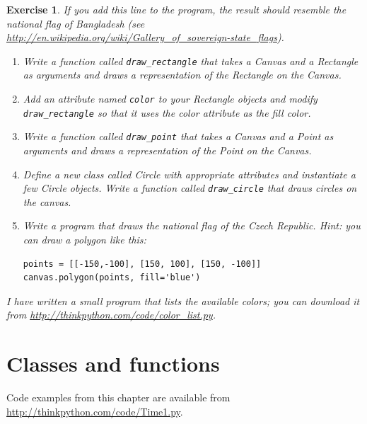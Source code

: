 \documentclass[12pt,a4paper,final,twoside,onecolumn,titlepage]{book}
\newtheorem{exercise}{Exercise}[chapter]
\begin{document}
\begin{exercise}
If you add this line to the program, 
the result should resemble the national flag of Bangladesh
(see \url{http://en.wikipedia.org/wiki/Gallery_of_sovereign-state_flags}).

\begin{enumerate}

\item Write a function called \verb"draw_rectangle" that takes a
  Canvas and a Rectangle as arguments and draws a
  representation of the Rectangle on the Canvas.

\item Add an attribute named {\tt color} to your Rectangle objects and
  modify \verb"draw_rectangle" so that it uses the color attribute as
  the fill color.

\item Write a function called \verb"draw_point" that takes a
  Canvas and a Point as arguments and draws a
  representation of the Point on the Canvas.

\item Define a new class called Circle with appropriate attributes and
  instantiate a few Circle objects.  Write a function called
  \verb"draw_circle" that draws circles on the canvas.

\item Write a program that draws the national flag of the Czech Republic.
Hint: you can draw a polygon like this:

\begin{verbatim}
points = [[-150,-100], [150, 100], [150, -100]]
canvas.polygon(points, fill='blue')
\end{verbatim}

\end{enumerate}

I have written a small program that lists the available colors;
you can download it from \url{http://thinkpython.com/code/color_list.py}.

\end{exercise}


\chapter{Classes and functions}
\label{time}

Code examples from this chapter are available from
\url{http://thinkpython.com/code/Time1.py}.
\end{document}
